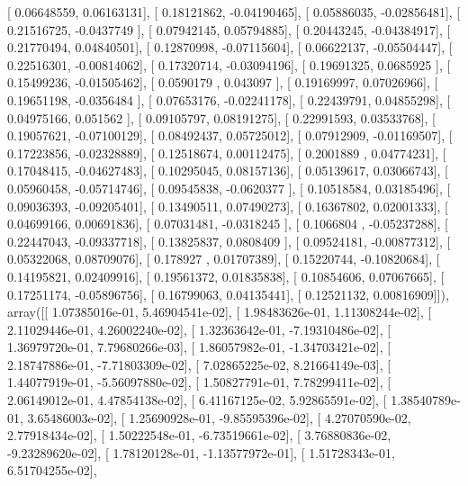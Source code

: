 \documentclass{article}
\begin{document}
       [ 0.06648559,  0.06163131],
       [ 0.18121862, -0.04190465],
       [ 0.05886035, -0.02856481],
       [ 0.21516725, -0.0437749 ],
       [ 0.07942145,  0.05794885],
       [ 0.20443245, -0.04384917],
       [ 0.21770494,  0.04840501],
       [ 0.12870998, -0.07115604],
       [ 0.06622137, -0.05504447],
       [ 0.22516301, -0.00814062],
       [ 0.17320714, -0.03094196],
       [ 0.19691325,  0.0685925 ],
       [ 0.15499236, -0.01505462],
       [ 0.0590179 ,  0.043097  ],
       [ 0.19169997,  0.07026966],
       [ 0.19651198, -0.0356484 ],
       [ 0.07653176, -0.02241178],
       [ 0.22439791,  0.04855298],
       [ 0.04975166,  0.051562  ],
       [ 0.09105797,  0.08191275],
       [ 0.22991593,  0.03533768],
       [ 0.19057621, -0.07100129],
       [ 0.08492437,  0.05725012],
       [ 0.07912909, -0.01169507],
       [ 0.17223856, -0.02328889],
       [ 0.12518674,  0.00112475],
       [ 0.2001889 ,  0.04774231],
       [ 0.17048415, -0.04627483],
       [ 0.10295045,  0.08157136],
       [ 0.05139617,  0.03066743],
       [ 0.05960458, -0.05714746],
       [ 0.09545838, -0.0620377 ],
       [ 0.10518584,  0.03185496],
       [ 0.09036393, -0.09205401],
       [ 0.13490511,  0.07490273],
       [ 0.16367802,  0.02001333],
       [ 0.04699166,  0.00691836],
       [ 0.07031481, -0.0318245 ],
       [ 0.1066804 , -0.05237288],
       [ 0.22447043, -0.09337718],
       [ 0.13825837,  0.0808409 ],
       [ 0.09524181, -0.00877312],
       [ 0.05322068,  0.08709076],
       [ 0.178927  ,  0.01707389],
       [ 0.15220744, -0.10820684],
       [ 0.14195821,  0.02409916],
       [ 0.19561372,  0.01835838],
       [ 0.10854606,  0.07067665],
       [ 0.17251174, -0.05896756],
       [ 0.16799063,  0.04135441],
       [ 0.12521132,  0.00816909]]), array([[  1.07385016e-01,   5.46904541e-02],
       [  1.98483626e-01,   1.11308244e-02],
       [  2.11029446e-01,   4.26002240e-02],
       [  1.32363642e-01,  -7.19310486e-02],
       [  1.36979720e-01,   7.79680266e-03],
       [  1.86057982e-01,  -1.34703421e-02],
       [  2.18747886e-01,  -7.71803309e-02],
       [  7.02865225e-02,   8.21664149e-03],
       [  1.44077919e-01,  -5.56097880e-02],
       [  1.50827791e-01,   7.78299411e-02],
       [  2.06149012e-01,   4.47854138e-02],
       [  6.41167125e-02,   5.92865591e-02],
       [  1.38540789e-01,   3.65486003e-02],
       [  1.25690928e-01,  -9.85595396e-02],
       [  4.27070590e-02,   2.77918434e-02],
       [  1.50222548e-01,  -6.73519661e-02],
       [  3.76880836e-02,  -9.23289620e-02],
       [  1.78120128e-01,  -1.13577972e-01],
       [  1.51728343e-01,   6.51704255e-02],
\end{document}
